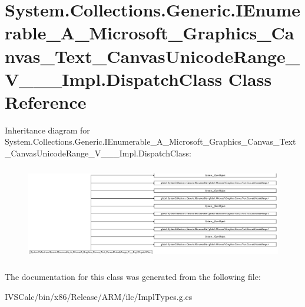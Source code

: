 \hypertarget{class_system_1_1_collections_1_1_generic_1_1_i_enumerable___a___microsoft___graphics___canvas___044287a6361082b7dd94409be5446875}{}\section{System.\+Collections.\+Generic.\+I\+Enumerable\+\_\+\+A\+\_\+\+Microsoft\+\_\+\+Graphics\+\_\+\+Canvas\+\_\+\+Text\+\_\+\+Canvas\+Unicode\+Range\+\_\+\+V\+\_\+\+\_\+\+\_\+\+Impl.\+Dispatch\+Class Class Reference}
\label{class_system_1_1_collections_1_1_generic_1_1_i_enumerable___a___microsoft___graphics___canvas___044287a6361082b7dd94409be5446875}
Inheritance diagram for System.\+Collections.\+Generic.\+I\+Enumerable\+\_\+\+A\+\_\+\+Microsoft\+\_\+\+Graphics\+\_\+\+Canvas\+\_\+\+Text\+\_\+\+Canvas\+Unicode\+Range\+\_\+\+V\+\_\+\+\_\+\+\_\+\+Impl.\+Dispatch\+Class\+:\begin{figure}[H]
\begin{center}
\leavevmode
\includegraphics[height=4.173441cm]{class_system_1_1_collections_1_1_generic_1_1_i_enumerable___a___microsoft___graphics___canvas___044287a6361082b7dd94409be5446875}
\end{center}
\end{figure}


The documentation for this class was generated from the following file\+:\begin{DoxyCompactItemize}
\item 
I\+V\+S\+Calc/bin/x86/\+Release/\+A\+R\+M/ilc/Impl\+Types.\+g.\+cs\end{DoxyCompactItemize}
